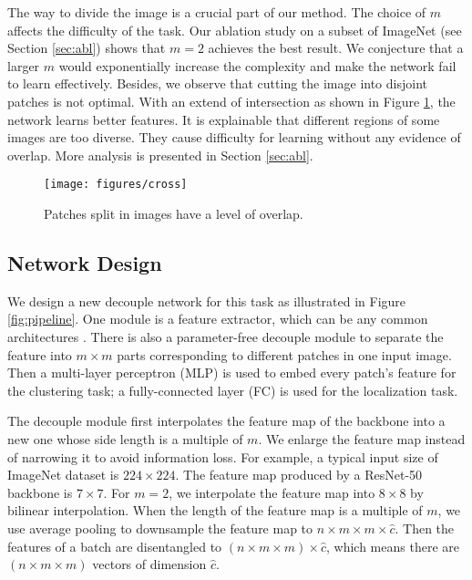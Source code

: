\documentclass[final]{cvpr}
\begin{document}
The way to divide the image is a crucial part of our method. The choice of $m$ affects the difficulty of the task. Our ablation study on a subset of ImageNet (see Section \ref{sec:abl}) shows that $m=2$ achieves the best result. We conjecture that a larger $m$ would exponentially increase the complexity and make the network fail to learn effectively. Besides, we observe that cutting the image into disjoint patches is not optimal. With an extend of intersection as shown in Figure \ref{fig:cross}, the network learns better features. It is explainable that different regions of some images are too diverse. They cause difficulty for learning without any evidence of overlap. More analysis is presented in Section \ref{sec:abl}.

\begin{figure}
	\vspace{-0.2in}
	\centering
	\texttt{[image: figures/cross]}
	\caption{Patches split in images have a level of overlap.}
	\label{fig:cross}
	\vspace{-0.1in}
\end{figure}

\subsection{Network Design}
We design a new decouple network for this task as illustrated in Figure \ref{fig:pipeline}. One module is a feature extractor, which can be any common architectures \cite{resnet,vgg,wideresnet,resnext,inceptionv2}. There is also a parameter-free decouple module to separate the feature into $m\times m$ parts corresponding to different patches in one input image. Then a multi-layer perceptron (MLP) is used to embed every patch's feature for the clustering task; a fully-connected layer (FC) is used for the localization task.

The decouple module first interpolates the feature map of the backbone into a new one whose side length is a multiple of $m$. We enlarge the feature map instead of narrowing it to avoid information loss. For example, a typical input size of ImageNet dataset is $224 \times 224$. The feature map produced by a ResNet-50 backbone is $7\times 7$. For $m=2$, we interpolate the feature map into $8\times 8$ by bilinear interpolation. When the length of the feature map is a multiple of $m$, we use average pooling to downsample the feature map to $n\times m \times m \times \hat{c}$. Then the features of a batch are disentangled to $(n\times m \times m) \times \hat{c}$, which means there are $(n\times m \times m)$ vectors of dimension $\hat{c}$. 
\end{document}
